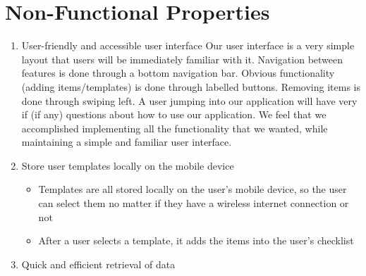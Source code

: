 \documentclass[12pt]{article}
\begin{document}
	\section*{Non-Functional Properties}


	\begin{enumerate}
		\item{User-friendly and accessible user interface}
		Our user interface is a very simple layout that users will be immediately familiar with it. Navigation between features is done through a bottom navigation bar.
		Obvious functionality (adding items/templates) is done through labelled buttons. Removing items is done through swiping left.
		A user jumping into our application will have very if (if any) questions about how to use our application.
		We feel that we accomplished implementing all the functionality that we wanted, while maintaining a simple and familiar user interface.

		\item{Store user templates locally on the mobile device}
		\begin{itemize}
			\item Templates are all stored locally on the user's mobile device, so the user can select them no matter if they have a wireless internet connection or not
			\item After a user selects a template, it adds the items into the user's checklist
		\end{itemize}

		\item{Quick and efficient retrieval of data}
	\end{enumerate}

	\pagebreak
\end{document}
